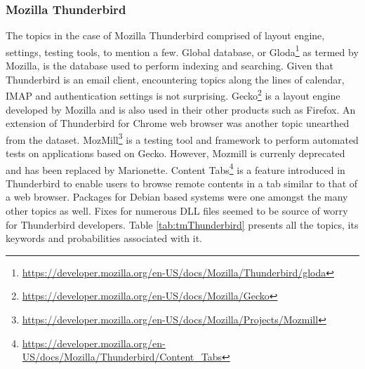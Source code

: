 \documentclass[a4paper,12pt,twoside]{report}
\begin{document}
\subsubsection{Mozilla Thunderbird}
The topics in the case of Mozilla Thunderbird comprised of layout engine, settings, testing tools, to mention a few. Global database, or Gloda\footnote{\url{https://developer.mozilla.org/en-US/docs/Mozilla/Thunderbird/gloda}} as termed by Mozilla, is the database used to perform indexing and searching. Given that Thunderbird is an email client, encountering topics along the lines of calendar, IMAP and authentication settings is not surprising. Gecko\footnote{\url{https://developer.mozilla.org/en-US/docs/Mozilla/Gecko}} is a layout engine developed by Mozilla and is also used in their other products such as Firefox. An extension of Thunderbird for Chrome web browser was another topic unearthed from the dataset. MozMill\footnote{\url{https://developer.mozilla.org/en-US/docs/Mozilla/Projects/Mozmill}} is a testing tool and framework to perform automated tests on applications based on Gecko. However, Mozmill is currenly deprecated and has been replaced by Marionette. Content Tabs\footnote{\url{https://developer.mozilla.org/en-US/docs/Mozilla/Thunderbird/Content_Tabs}} is a feature introduced in Thunderbird to enable users to browse remote contents in a tab similar to that of a web browser. Packages for Debian based systems were one amongst the many other topics as well. Fixes for numerous DLL files seemed to be source of worry for Thunderbird developers. Table \ref{tab:tmThunderbird} presents all the topics, its keywords and probabilities associated with it. 
\end{document}
